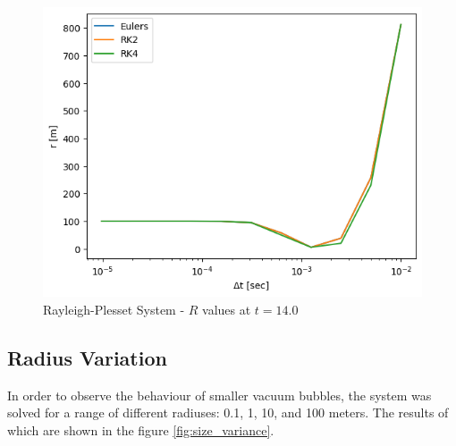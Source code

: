\documentclass[12pt]{article}
\begin{document}
\begin{figure}[H]
    \centering
    \includegraphics[scale=0.75]{out/error/Question_2/r_at_t.png}
    \caption{Rayleigh-Plesset System - $R$ values at $t=14.0$}
    \label{fig:part_2_r_at_t}
\end{figure}

\subsection{Radius Variation}

In order to observe the behaviour of smaller vacuum bubbles, the system was solved for a range of different radiuses: 0.1, 1, 10, and 100 meters. The results of which are shown in the figure \ref{fig:size_variance}.
\end{document}
